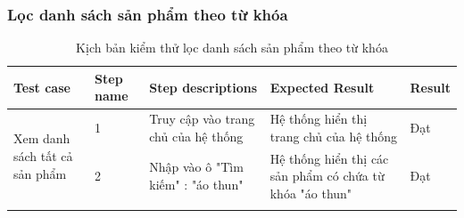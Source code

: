 \subsubsection{Lọc danh sách sản phẩm theo từ khóa}
{
    \setlength\extrarowheight{6pt}
    \begin{longtable}{| p{2.5cm}| p{1cm}| p{5.5cm}| p{4.5cm} | p{1.5cm} |}
        \hline
        \textbf{Test case}                                       & \textbf{Step name} & \textbf{Step descriptions} & \textbf{Expected Result} & \textbf{Result} \\
        \hline
        \multirow[t]{2}{2.5cm}{Xem danh sách tất cả sản phẩm}    &
        1                                                        &
        Truy cập vào trang chủ của hệ thống                      &
        Hệ thống hiển thị trang chủ của hệ thống                 &
        Đạt                                                                                                                                                     \\
        \cline{2-5}
                                                                 & 2                  &
        Nhập vào ô "Tìm kiếm" : "áo thun"                        &
        Hệ thống hiển thị các sản phẩm có chứa từ khóa "áo thun" &
        Đạt                                                                                                                                                     \\
        \hline
        \caption{Kịch bản kiểm thử lọc danh sách sản phẩm theo từ khóa}
    \end{longtable}
}

